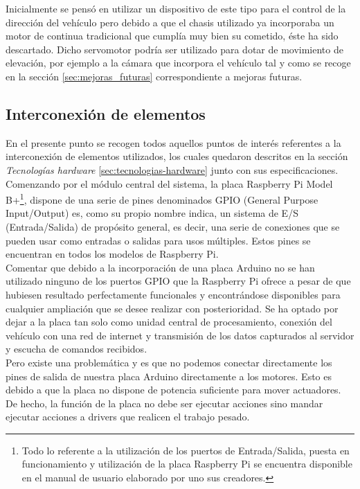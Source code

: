 Inicialmente se pensó en utilizar un dispositivo de este tipo para el control de la dirección del vehículo pero debido a que el chasis utilizado ya incorporaba un motor de continua tradicional
que cumplía muy bien su cometido, éste ha sido descartado. Dicho servomotor podría ser utilizado para dotar de movimiento de elevación, por ejemplo a la cámara que incorpora el vehículo tal y como
se recoge en la sección \ref{sec:mejoras_futuras} correspondiente a mejoras futuras.\\

\subsection{Interconexión de elementos}

En el presente punto se recogen todos aquellos puntos de interés referentes a la interconexión de elementos utilizados, los cuales quedaron descritos en la sección \emph{Tecnologías hardware}
\ref{sec:tecnologias-hardware} junto con sus especificaciones.\\

Comenzando por el módulo central del sistema, la placa Raspberry Pi Model B+\footnote{ Todo lo referente a la utilización de los puertos de Entrada/Salida, puesta en funcionamiento y
utilización de la placa Raspberry Pi se encuentra disponible en el manual de usuario \cite{book:Raspberry} elaborado por uno sus creadores. }, dispone de una serie de pines denominados GPIO (General Purpose Input/Output) es, como su propio nombre indica, 
un sistema de E/S (Entrada/Salida) de propósito general, es decir, una serie de conexiones que se pueden usar como entradas o salidas para usos múltiples. Estos pines se encuentran en todos
los modelos de Raspberry Pi.\\

Comentar que debido a la incorporación de una placa Arduino no se han utilizado ninguno de los puertos GPIO que la Raspberry Pi ofrece a pesar de que hubiesen resultado perfectamente 
funcionales y encontrándose disponibles para cualquier ampliación que se desee realizar con posterioridad. Se ha optado por dejar a la placa tan solo como unidad central de 
procesamiento, conexión del vehículo con una red de internet y transmisión de los datos capturados al servidor y escucha de comandos recibidos.\\

Pero existe una problemática y es que no podemos conectar directamente los pines de salida de nuestra placa Arduino directamente a los motores. Esto es debido a
que la placa no dispone de potencia suficiente para mover actuadores. De hecho, la función de la placa no debe ser ejecutar acciones sino mandar ejecutar acciones a drivers que
realicen el trabajo pesado.\\

